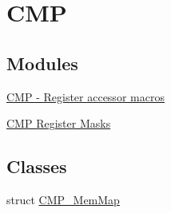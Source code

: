 \hypertarget{group___c_m_p___peripheral}{}\section{C\+MP}
\label{group___c_m_p___peripheral}
\subsection*{Modules}
\begin{DoxyCompactItemize}
\item 
\hyperlink{group___c_m_p___register___accessor___macros}{C\+M\+P -\/ Register accessor macros}
\item 
\hyperlink{group___c_m_p___register___masks}{C\+M\+P Register Masks}
\end{DoxyCompactItemize}
\subsection*{Classes}
\begin{DoxyCompactItemize}
\item 
struct \hyperlink{struct_c_m_p___mem_map}{C\+M\+P\+\_\+\+Mem\+Map}
\end{DoxyCompactItemize}
